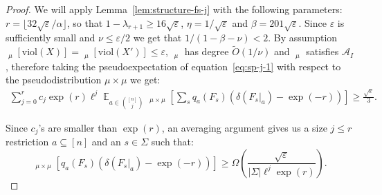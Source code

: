\documentclass[11pt]{article}
\DeclareMathOperator*{\E}{\mathbb{E}}
\DeclareMathOperator*{\pE}{\widetilde{\mathbb{E}}}
\def \cA {\mathcal{A}}
\def \eps {{\varepsilon}}
\def \viol {\mathrm{viol}}
\theoremstyle{definition}
\begin{document}
\begin{proof}


We will apply Lemma~\ref{lem:structure-fs-j} with the following parameters: $r = \lfloor 32\sqrt{\eps}/\alpha \rfloor$, so that $1 - \lambda_{r+1} \geq 16\sqrt{\eps}$,  $\eta = 1/\sqrt{\eps}$ and $\beta = 201\sqrt{\eps}$.
Since $\eps$ is sufficiently small and $\nu \leq \eps/2$ we get that $1/(1 - \beta - \nu) < 2$. By assumption $\pE_\mu[\viol(X)] = \pE_\mu[\viol(X')] \le \eps$, $\pE_\mu$ has degree $\widetilde{O}(1/\nu)$ and $\pE_\mu$ satisfies $\cA_I$, therefore taking the pseudoexpectation of equation~\ref{eq:sp-j-1} with respect to the pseudodistribution $\mu \times \mu$ we get:
\begin{align}
\sum_{j = 0}^r c_j \exp(r) \ell^j \E_{a \in {[n] \choose j}}\pE_{\mu \times \mu}[\sum_{s}q_{a}(F_s)(\delta(F_s|_a) - \exp(-r))] \geq \frac{\sqrt{\eps}}{3}.    
\end{align}

Since $c_j$'s are smaller than $\exp(r)$, an averaging argument gives us a size $j \leq r$ restriction $a \subseteq [n]$ and an $s \in \Sigma$ such that:
\begin{equation}\label{eq:sp-j-2}
\pE_{\mu \times \mu}[q_{a}(F_s)(\delta(F_s|_a) - \exp(-r))] \geq \Omega\left(\frac{\sqrt{\eps}}{|\Sigma|\ell^{j}\exp(r)}\right).
\end{equation}


\end{proof}
\end{document}
